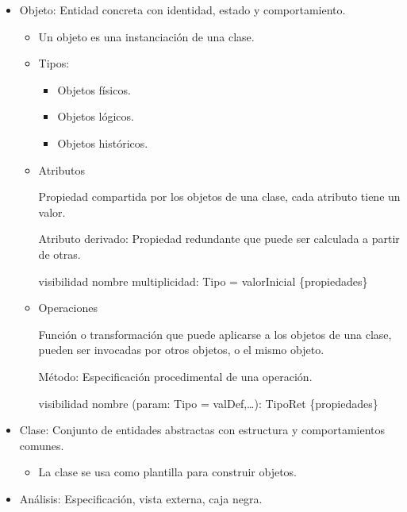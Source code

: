 \documentclass[12pt, twoside, openright]{report} %
\begin{document}
    \begin{itemize}
    \item
      Objeto: Entidad concreta con identidad, estado y comportamiento.

      \begin{itemize}
      \item
        Un objeto es una instanciación de una clase.
      \item
        Tipos:

        \begin{itemize}
        
        \item
          Objetos físicos.
        \item
          Objetos lógicos.
        \item
          Objetos históricos.
        \end{itemize}
      \item
        Atributos

        Propiedad compartida por los objetos de una clase, cada atributo
        tiene un valor.

        Atributo derivado: Propiedad redundante que puede ser calculada
        a partir de otras.

        visibilidad nombre multiplicidad: Tipo = valorInicial
        \{propiedades\}
      \item
        Operaciones

        Función o transformación que puede aplicarse a los objetos de
        una clase, pueden ser invocadas por otros objetos, o el mismo
        objeto.

        Método: Especificación procedimental de una operación.

        visibilidad nombre (param: Tipo = valDef,\ldots): TipoRet
        \{propiedades\}
      \end{itemize}
    \item
      Clase: Conjunto de entidades abstractas con estructura y
      comportamientos comunes.

      \begin{itemize}
      
      \item
        La clase se usa como plantilla para construir objetos.
      \end{itemize}
    \item
      Análisis: Especificación, vista externa, caja negra.

      \begin{itemize}
      

\end{itemize}
\end{itemize}
\end{document}
